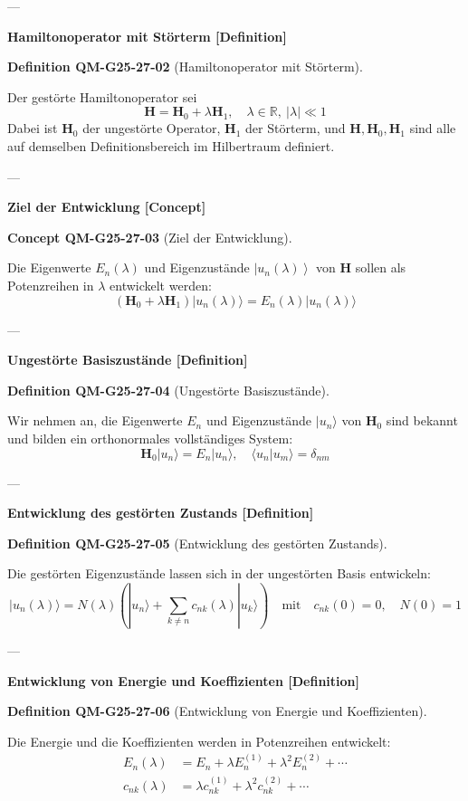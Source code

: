 \documentclass[10pt, letterpaper]{article}
\newcommand{\CustomHeading}[3]{%
  \par\medskip\noindent%
  \textbf{#1 #2} \textnormal{(#3)}.\enskip%
}
\newenvironment{DEF}[2]{\begin{unitbox}\CustomHeading{Definition}{#1}{#2}}{\end{unitbox}}
\newenvironment{CONC}[2]{\begin{unitbox}\CustomHeading{Concept}{#1}{#2}}{\end{unitbox}}
\begin{document}
---

\textbf{Hamiltonoperator mit Störterm [Definition]}

\begin{DEF}{QM-G25-27-02}{Hamiltonoperator mit Störterm}
Der gestörte Hamiltonoperator sei
\[
\mathbf{H} = \mathbf{H}_0 + \lambda \mathbf{H}_1, \quad \lambda \in \mathbb{R},\ |\lambda| \ll 1
\]
Dabei ist $\mathbf{H}_0$ der ungestörte Operator, $\mathbf{H}_1$ der Störterm, und $\mathbf{H}, \mathbf{H}_0, \mathbf{H}_1$ sind alle auf demselben Definitionsbereich im Hilbertraum definiert.
\end{DEF}

---

\textbf{Ziel der Entwicklung [Concept]}

\begin{CONC}{QM-G25-27-03}{Ziel der Entwicklung}
Die Eigenwerte $E_n(\lambda)$ und Eigenzustände $\left|u_n(\lambda)\right\rangle$ von $\mathbf{H}$ sollen als Potenzreihen in $\lambda$ entwickelt werden:
\[
\left( \mathbf{H}_0 + \lambda \mathbf{H}_1 \right) |u_n(\lambda)\rangle = E_n(\lambda) |u_n(\lambda)\rangle
\]
\end{CONC}

---

\textbf{Ungestörte Basiszustände [Definition]}

\begin{DEF}{QM-G25-27-04}{Ungestörte Basiszustände}
Wir nehmen an, die Eigenwerte $E_n$ und Eigenzustände $|u_n\rangle$ von $\mathbf{H}_0$ sind bekannt und bilden ein orthonormales vollständiges System:
\[
\mathbf{H}_0 |u_n\rangle = E_n |u_n\rangle, \quad \langle u_n | u_m \rangle = \delta_{nm}
\]
\end{DEF}

---

\textbf{Entwicklung des gestörten Zustands [Definition]}

\begin{DEF}{QM-G25-27-05}{Entwicklung des gestörten Zustands}
Die gestörten Eigenzustände lassen sich in der ungestörten Basis entwickeln:
\[
|u_n(\lambda)\rangle = N(\lambda) \left( |u_n\rangle + \sum_{k\neq n} c_{nk}(\lambda) |u_k\rangle \right)
\quad \text{mit} \quad c_{nk}(0) = 0, \quad N(0) = 1
\]
\end{DEF}

---

\textbf{Entwicklung von Energie und Koeffizienten [Definition]}

\begin{DEF}{QM-G25-27-06}{Entwicklung von Energie und Koeffizienten}
Die Energie und die Koeffizienten werden in Potenzreihen entwickelt:
\[
\begin{aligned}
E_n(\lambda) &= E_n + \lambda E_n^{(1)} + \lambda^2 E_n^{(2)} + \cdots \\
c_{nk}(\lambda) &= \lambda c_{nk}^{(1)} + \lambda^2 c_{nk}^{(2)} + \cdots
\end{aligned}
\]
\end{DEF}
\end{document}
